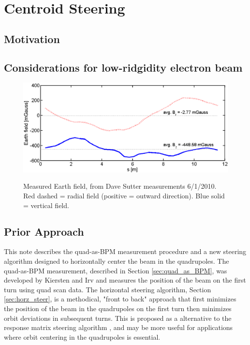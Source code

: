
\renewcommand{\thechapter}{3}

\chapter{Centroid Steering}

\section{Motivation}



\section{Considerations for low-ridgidity electron beam}


\begin{figure}
\begin{center}
\includegraphics[width=\textwidth]{3.figures/Earth_field.eps}
\end{center}
\renewcommand{\baselinestretch}{1}
\small\normalsize
\begin{quote}
\caption[Figure with caption indented]{Measured Earth field, from Dave Sutter measurements 6/1/2010. Red dashed = radial field (positive = outward direction). Blue solid = vertical field.}
\label{fig:earthfield}
\end{quote}
\end{figure} 
\renewcommand{\baselinestretch}{2}
\small\normalsize


\section{Prior Approach}


This note describes the quad-as-BPM measurement procedure and a new steering algorithm designed to horizontally center the beam in the quadrupoles. 
The quad-as-BPM measurement, described in Section \ref{sec:quad_as_BPM}, was developed by Kiersten and Irv and measures the position of the beam 
on the first turn using quad scan data. The horizontal steering algorithm, Section \ref{sec:horz_steer}, is a methodical, "front to back" approach 
that first minimizes the position of the beam in the quadrupoles on the first turn then minimizes orbit deviations in subsequent turns. This is 
proposed as a alternative to the response matrix steering algorithm \cite{response_matrix}, and may be more useful for applications where orbit 
centering in the quadrupoles is essential.


